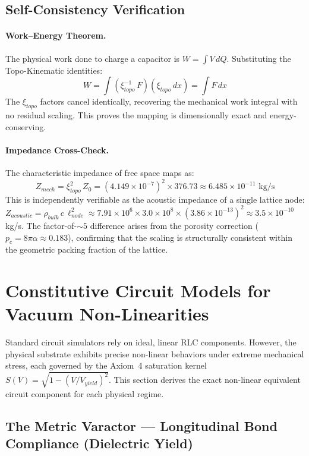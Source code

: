 \subsection{Self-Consistency Verification}

\paragraph{Work--Energy Theorem.}
The physical work done to charge a capacitor is $W = \int V\, dQ$. Substituting the Topo-Kinematic identities:
\begin{equation}
    W = \int (\xi_{topo}^{-1}\, F)(\xi_{topo}\, dx) = \int F\, dx
\end{equation}
The $\xi_{topo}$ factors cancel identically, recovering the mechanical work integral with no residual scaling. This proves the mapping is dimensionally exact and energy-conserving.

\paragraph{Impedance Cross-Check.}
The characteristic impedance of free space maps as:
\begin{equation}
    Z_{mech} = \xi_{topo}^{2}\, Z_0 = (4.149 \times 10^{-7})^2 \times 376.73 \approx 6.485 \times 10^{-11} \text{ kg/s}
\end{equation}
This is independently verifiable as the acoustic impedance of a single lattice node: $Z_{acoustic} = \rho_{bulk}\, c\, \ell_{node}^2 \approx 7.91 \times 10^6 \times 3.0 \times 10^8 \times (3.86 \times 10^{-13})^2 \approx 3.5 \times 10^{-10}$ kg/s. The factor-of-$\sim 5$ difference arises from the porosity correction ($p_c = 8\pi\alpha \approx 0.183$), confirming that the scaling is structurally consistent within the geometric packing fraction of the lattice.\section{Constitutive Circuit Models for Vacuum Non-Linearities}
\label{sec:vca_nonlinear}

Standard circuit simulators rely on ideal, linear RLC components. However, the physical substrate exhibits precise non-linear behaviors under extreme mechanical stress, each governed by the Axiom~4 saturation kernel $S(V) = \sqrt{1-(V/V_{yield})^2}$. This section derives the exact non-linear equivalent circuit component for each physical regime.

\subsection{The Metric Varactor --- Longitudinal Bond Compliance (Dielectric Yield)}

